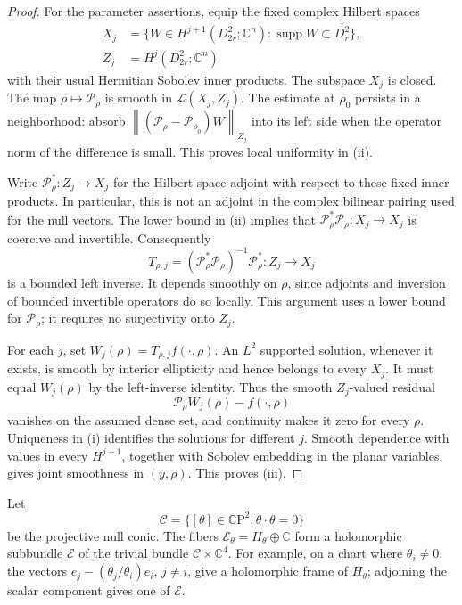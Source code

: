 \documentclass[11pt]{article}
\newcommand{\C}{\mathbb C}
\DeclareMathOperator{\supp}{supp}
\newcommand{\norm}[1]{\left\lVert #1\right\rVert}
\newcommand{\Ecal}{\mathcal E}
\newcommand{\Pcal}{\mathcal P}
\theoremstyle{remark}
\numberwithin{equation}{section}
\begin{document}
\begin{proof}
For the parameter assertions, equip the fixed complex Hilbert spaces
\[
 \begin{aligned}
 X_j&=\{W\in H^{j+1}(D_{2r}^2;\C^n):
                  \supp W\subset\overline{D_r^2}\},\\
 Z_j&=H^j(D_{2r}^2;\C^n)
 \end{aligned}
\]
with their usual Hermitian Sobolev inner products. The subspace $X_j$
is closed. The map $\rho\mapsto\Pcal_\rho$ is smooth in
$\mathcal L(X_j,Z_j)$. The estimate at $\rho_0$ persists in a
neighborhood: absorb
$\norm{(\Pcal_\rho-\Pcal_{\rho_0})W}_{Z_j}$ into its left side when
the operator norm of the difference is small. This proves local
uniformity in \textup{(ii)}.

Write $\Pcal_\rho^*:Z_j\to X_j$ for the Hilbert space adjoint with
respect to these fixed inner products. In particular, this is not an
adjoint in the complex bilinear pairing used for the null vectors.
The lower bound in \textup{(ii)} implies that
$\Pcal_\rho^*\Pcal_\rho:X_j\to X_j$ is coercive and invertible.
Consequently
\begin{equation}\label{eq:supported-left-inverse}
 T_{\rho,j}
   =(\Pcal_\rho^*\Pcal_\rho)^{-1}\Pcal_\rho^*
       :Z_j\longrightarrow X_j
\end{equation}
is a bounded left inverse. It depends smoothly on $\rho$, since
adjoints and inversion of bounded invertible operators do so locally.
This argument uses a lower bound for $\Pcal_\rho$; it requires no
surjectivity onto $Z_j$.

For each $j$, set $W_j(\rho)=T_{\rho,j}f(\cdot,\rho)$. An $L^2$
supported solution, whenever it exists, is smooth by interior
ellipticity and hence belongs to every $X_j$. It must equal
$W_j(\rho)$ by the left-inverse identity. Thus the smooth
$Z_j$-valued residual
\[
 \Pcal_\rho W_j(\rho)-f(\cdot,\rho)
\]
vanishes on the assumed dense set, and continuity makes it zero for
every $\rho$. Uniqueness in \textup{(i)} identifies the solutions for
different $j$. Smooth dependence with values in every $H^{j+1}$,
together with Sobolev embedding in the planar variables, gives joint
smoothness in $(y,\rho)$. This proves \textup{(iii)}.
\end{proof}

Let
\[
 \mathcal C=\{[\theta]\in\C\mathrm P^2:
                         \theta\cdot\theta=0\}
\]
be the projective null conic. The fibers
$\Ecal_\theta=H_\theta\oplus\C$ form a holomorphic subbundle
$\Ecal$ of the trivial bundle $\mathcal C\times\C^4$. For example,
on a chart where $\theta_i\ne0$, the vectors
$e_j-(\theta_j/\theta_i)e_i$, $j\ne i$, give a holomorphic frame
of $H_\theta$; adjoining the scalar component gives one of $\Ecal$.
\end{document}

